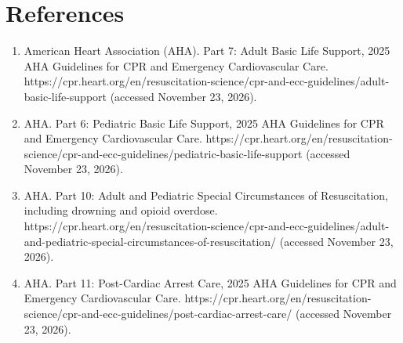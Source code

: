 \section*{References}
\begin{enumerate}
  \item American Heart Association (AHA). Part 7: Adult Basic Life Support, 2025 AHA Guidelines for CPR and Emergency Cardiovascular Care. https://cpr.heart.org/en/resuscitation-science/cpr-and-ecc-guidelines/adult-basic-life-support (accessed November 23, 2026).
  \item AHA. Part 6: Pediatric Basic Life Support, 2025 AHA Guidelines for CPR and Emergency Cardiovascular Care. https://cpr.heart.org/en/resuscitation-science/cpr-and-ecc-guidelines/pediatric-basic-life-support (accessed November 23, 2026).
  \item AHA. Part 10: Adult and Pediatric Special Circumstances of Resuscitation, including drowning and opioid overdose. https://cpr.heart.org/en/resuscitation-science/cpr-and-ecc-guidelines/adult-and-pediatric-special-circumstances-of-resuscitation/ (accessed November 23, 2026).
  \item AHA. Part 11: Post-Cardiac Arrest Care, 2025 AHA Guidelines for CPR and Emergency Cardiovascular Care. https://cpr.heart.org/en/resuscitation-science/cpr-and-ecc-guidelines/post-cardiac-arrest-care/ (accessed November 23, 2026).
\end{enumerate}
\clearpage
